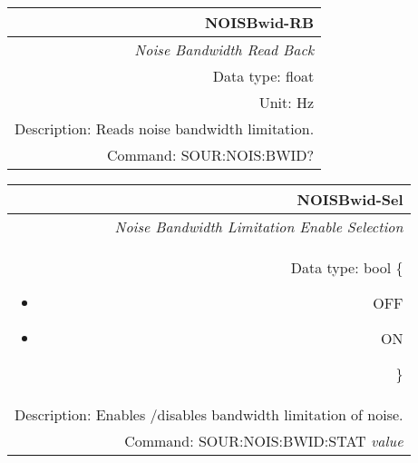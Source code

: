 \documentclass[openany]{article}
\begin{document}
		\begin{tabular}{N}
			\hline
			\bfseries NOISBwid-RB \\ \hline
			\emph{Noise Bandwidth Read Back} \\
			Data type: float \\
			Unit: Hz \\
			Description: Reads noise bandwidth limitation. \\
			Command: SOUR:NOIS:BWID? \\

		\end{tabular}
%
		\begin{tabular}{N}
			\hline
			\bfseries NOISBwid-Sel \\ \hline
			\emph{Noise Bandwidth Limitation Enable Selection} \\
			Data type: bool \{\begin{itemize}[noitemsep]
				\small
				\item[] OFF
				\item[] ON
			\end{itemize}\} \\
			Description: Enables /disables bandwidth limitation of noise. \\
			Command: SOUR:NOIS:BWID:STAT \emph{value} \\

		\end{tabular}
\end{document}
